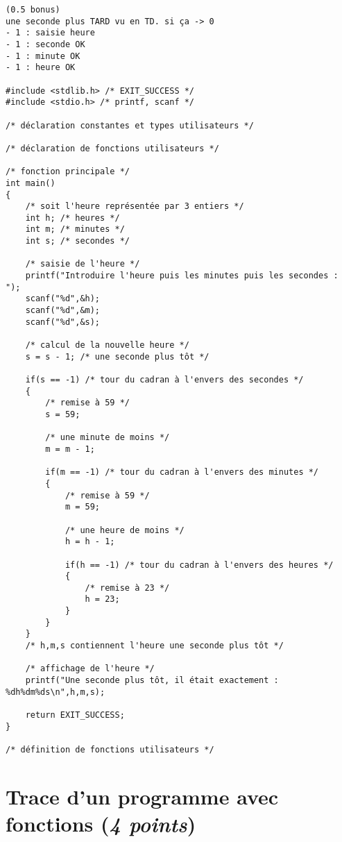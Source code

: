   \begin{correction}
\begin{small}
\begin{verbatim}
(0.5 bonus) 
une seconde plus TARD vu en TD. si ça -> 0
- 1 : saisie heure
- 1 : seconde OK
- 1 : minute OK
- 1 : heure OK

#include <stdlib.h> /* EXIT_SUCCESS */
#include <stdio.h> /* printf, scanf */

/* déclaration constantes et types utilisateurs */

/* déclaration de fonctions utilisateurs */

/* fonction principale */
int main()
{
    /* soit l'heure représentée par 3 entiers */
    int h; /* heures */
    int m; /* minutes */
    int s; /* secondes */

    /* saisie de l'heure */
    printf("Introduire l'heure puis les minutes puis les secondes : ");
    scanf("%d",&h);
    scanf("%d",&m);
    scanf("%d",&s);

    /* calcul de la nouvelle heure */
    s = s - 1; /* une seconde plus tôt */

    if(s == -1) /* tour du cadran à l'envers des secondes */
    {
        /* remise à 59 */
        s = 59;

        /* une minute de moins */
        m = m - 1;

        if(m == -1) /* tour du cadran à l'envers des minutes */
        {
            /* remise à 59 */
            m = 59;

            /* une heure de moins */
            h = h - 1;

            if(h == -1) /* tour du cadran à l'envers des heures */
            {
                /* remise à 23 */
                h = 23;
            }
        }
    }
    /* h,m,s contiennent l'heure une seconde plus tôt */

    /* affichage de l'heure */
    printf("Une seconde plus tôt, il était exactement : %dh%dm%ds\n",h,m,s);

    return EXIT_SUCCESS;
}

/* définition de fonctions utilisateurs */

\end{verbatim}
\end{small}
  \end{correction}

\section{Trace d'un programme avec fonctions (\textit{4 points})}

